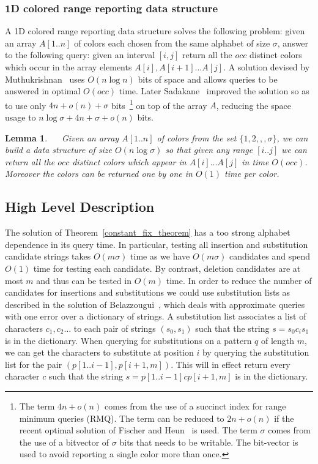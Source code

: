 \documentclass{article}
\newcommand{\?}{\mskip1.5mu}
\newtheorem{lemma}{Lemma}
\begin{document}
\subsubsection{1D colored range reporting data structure}
A 1D colored range reporting data structure solves the following problem: given an array $A[1..n]$ of colors each chosen from the same alphabet of size $\sigma$, answer to the following query: given an interval $[i,j]$ return all the $occ$ distinct colors which occur in the array elements $A[i],A[i+1]...A[j]$. A solution devised by Muthukrishnan~\cite{Mu02} uses $O(n\log n)$ bits of space and allows queries to be answered in optimal $O(occ)$ time. Later Sadakane~\cite{Sa07} improved the solution so as to use only $4n+o(n)+\sigma$ bits~\footnote{The term $4n+o(n)$ comes from the use of a succinct index for range minimum queries (RMQ). The term can be reduced to $2n+o(n)$ if the recent optimal solution of Fischer and Heun~\cite{Fi10} is used. The term $\sigma$ comes from the use of a bitvector of $\sigma$ bits that needs to be writable. The bit-vector is used to avoid reporting a single color more than once.} on top of the array $A$, reducing the space usage to $n\log\sigma+4n+\sigma+o(n)$ bits. \begin{lemma}~\cite{Sa07}
~\label{lemma:1D_color_rep}
Given an array $A[1..n]$ of colors from the set $\{1,2,,,\sigma\}$, we can build a data structure of size $O(n\log\sigma)$ so that given any range $[i..j]$ we can return all the $occ$ distinct colors which appear in $A[i]...A[j]$ in time $O(occ)$. Moreover the colors can be returned one by one in $O(1)$ time per color.
\end{lemma}

\subsection{High Level Description}
\label{section:arb_high_level_desc}

The solution of Theorem~\ref{constant_fix_theorem} has a too strong alphabet dependence in its query time. In particular, testing all insertion and substitution candidate strings takes $O(m\sigma)$ time as we have $O(m\sigma)$ candidates and spend $O(1)$ time for testing each candidate. By contrast, deletion candidates are at most $m$ and thus can be tested in $O(m)$ time. 
In order to reduce the number of candidates for insertions and substitutions we could use substitution lists as described in the solution of Belazzougui~\cite{B09}, which deals with approximate queries with one error over a dictionary of strings. 
A substitution list associates a list of characters $c_1,c_2\ldots$  to each pair of strings $(s_0,s_1)$ such that the string $s=s_0c_is_1$ is in the dictionary. When querying for substitutions on a pattern $q$ of length $m$, we can get the characters to substitute at position $i$ by querying the substitution list for the pair $(p[1..i-1],p[i+1,m])$. This will in effect return every character $c$ such that the string $s=p[1..i-1]cp[i+1,m]$ is in the dictionary. 
\end{document}
